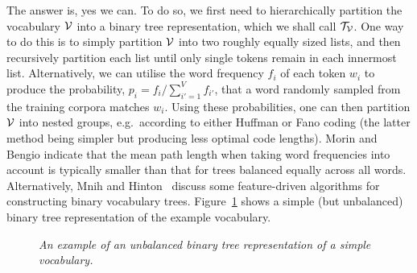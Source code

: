 \documentclass[a4paper]{article}
\begin{document}
The answer is, yes we can. To do so, we first need to hierarchically partition the vocabulary ${\cal V}$ into 
a binary tree representation, which we shall call ${\cal T}_{\cal V}$. 
One way to do this is to simply partition ${\cal V}$ into two roughly equally sized lists, and then
recursively partition each list until only single tokens remain in each innermost list.
Alternatively, we can utilise the word frequency $f_i$ of each token $w_i$ to produce the probability,
$p_i=f_i/\sum_{i'=1}^V f_{i'}$, that a word randomly sampled from the training corpora matches $w_i$.
Using these probabilities, one can then partition ${\cal V}$ into nested groups, e.g.\ according to
either Huffman or Fano coding (the latter method being simpler but producing less optimal code lengths).
Morin and Bengio\cite{Morin+Bengio-2005} indicate that the mean path length when taking word frequencies into account
is typically smaller than that for trees balanced equally across all words.
Alternatively, Mnih and Hinton~\cite{NIPS2008_3583} discuss some feature-driven algorithms for constructing
binary vocabulary trees.
Figure~\ref{fig:catdog} shows a simple (but unbalanced) binary tree representation of the example vocabulary. 
\begin{figure}[hbt]
\centering
{}
\caption{\em An example of an unbalanced binary tree representation of a simple vocabulary.}
\label{fig:catdog}
\end{figure}
\end{document}
